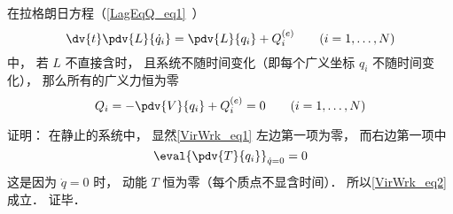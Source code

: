 
\begin{issues}
\issueDraft
\end{issues}


在拉格朗日方程（\autoref{LagEqQ_eq1}~）
\begin{equation}\label{VirWrk_eq1}
\dv{t} \pdv{L}{\dot q_i} = \pdv{L}{q_i} + Q_i^{(e)}
\qquad (i=1,\dots,N)
\end{equation}
中， 若 $L$ 不直接含时， 且系统不随时间变化（即每个广义坐标 $q_i$ 不随时间变化）， 那么所有的广义力恒为零
\begin{equation}\label{VirWrk_eq2}
Q_i = -\pdv{V}{q_i} + Q_i^{(e)} = 0 \qquad (i = 1,\dots,N)
\end{equation}

证明： 在静止的系统中， 显然\autoref{VirWrk_eq1} 左边第一项为零， 而右边第一项中
\begin{equation}
\eval{\pdv{T}{q_i}}_{\dot q = 0} = 0
\end{equation}
这是因为 $\dot q = 0$ 时， 动能 $T$ 恒为零（每个质点不显含时间）． 所以\autoref{VirWrk_eq2} 成立． 证毕．
